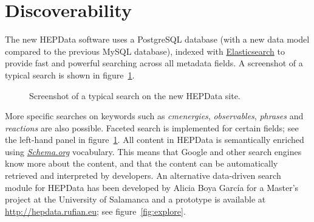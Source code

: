 \documentclass[a4paper]{jpconf}
\begin{document}
\section{Discoverability}

The new HEPData software uses a PostgreSQL database (with a new data model
compared to the previous MySQL database), indexed with
\href{https://www.elastic.co}{Elasticsearch} to provide fast and powerful
searching across all metadata fields.  A screenshot of a typical search is
shown in figure~\ref{fig:search}.
%
\begin{figure}
  \begin{center}
  \end{center}
  \caption{\label{fig:search}Screenshot of a typical search on the new HEPData
site.}
\end{figure}
%
More specific searches on keywords such as \emph{cmenergies},
\emph{observables}, \emph{phrases} and \emph{reactions} are also possible.
 Faceted search is implemented for certain fields; see the left-hand panel in
figure~\ref{fig:search}.  All content in HEPData is semantically enriched using
\href{https://schema.org/}{\emph{Schema.org}} vocabulary.  This means that
Google and other search engines know more about the content, and that the
content can be automatically retrieved and interpreted by developers.  An
alternative data-driven search module for HEPData has been developed by Alicia
Boya Garc\'{i}a for a Master's project at the University of Salamanca and a
prototype is available at \url{http://hepdata.rufian.eu}; see
figure~\ref{fig:explore}.
%
\end{document}
